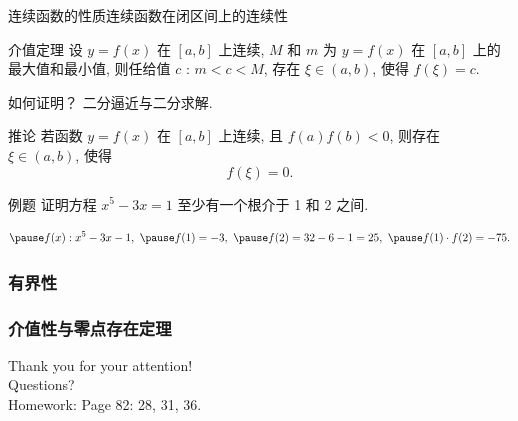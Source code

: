 \documentclass[
10pt,
aspectratio=43,
]{beamer}
\begin{document}
				\begin{frame}{连续函数的性质}{连续函数在闭区间上的连续性}
					\begin{block}{介值定理}
						设 $y=f(x)$ 在 $[a, b]$ 上连续, $M$ 和 $m$ 为 $y=f(x)$ 在 $[a, b]$ 上的最大值和最小值, 则任给值 $c$ : $m<c<M$, 存在 $\xi \in(a, b)$, 使得 $f(\xi)=c$.
					\end{block}
					\pause 如何证明？ \pause 二分逼近与二分求解.
					\begin{block}{推论}
						若函数 $y=f(x)$ 在 $[a, b]$ 上连续, 且 $f(a) f(b)<0$, 则存在 $\xi \in(a, b)$, 使得
						$$
						f(\xi)=0 .
						$$
					\end{block}
					\pause
					\begin{exampleblock}{例题}
						证明方程 $x^5-3 x=1$ 至少有一个根介于 1 和 2 之间.
					\end{exampleblock}
					\begin{equation*}
						\pause f(x):x^5-3 x-1, \,\, \pause f(1)=-3, \,\, \pause f(2)=32-6-1=25,\,\, \pause f(1)\cdot f(2) =-75.
					\end{equation*}
				\end{frame}
				
				\subsubsection{有界性}
				\subsubsection{介值性与零点存在定理}
				
				
				
				
				\begin{frame}[plain]
					\vfill
					\centering
					{
						\centering \Huge \color{white} Thank you for your attention!\\[10pt]Questions?\bigskip \\
						Homework: Page 82: 28, 31, 36.
					}
					\vfill
				\end{frame}
				
				
\end{document}
